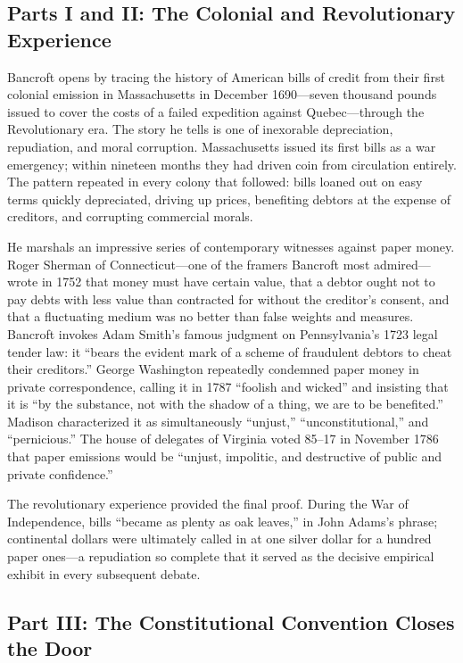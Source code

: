\documentclass[12pt]{article}
\begin{document}
\subsection{Parts I and II: The Colonial and Revolutionary Experience}

Bancroft opens by tracing the history of American bills of credit from
their first colonial emission in Massachusetts in December 1690---seven
thousand pounds issued to cover the costs of a failed expedition against
Quebec---through the Revolutionary era. The story he tells is one of
inexorable depreciation, repudiation, and moral corruption. Massachusetts
issued its first bills as a war emergency; within nineteen months they
had driven coin from circulation entirely. The pattern repeated in every
colony that followed: bills loaned out on easy terms quickly depreciated,
driving up prices, benefiting debtors at the expense of creditors, and
corrupting commercial morals.

He marshals an impressive series of contemporary witnesses against paper
money. Roger Sherman of Connecticut---one of the framers Bancroft most
admired---wrote in 1752 that money must have certain value, that a
debtor ought not to pay debts with less value than contracted for without
the creditor's consent, and that a fluctuating medium was no better than
false weights and measures. Bancroft invokes Adam Smith's famous judgment
on Pennsylvania's 1723 legal tender law: it ``bears the evident mark of
a scheme of fraudulent debtors to cheat their creditors.'' George
Washington repeatedly condemned paper money in private correspondence,
calling it in 1787 ``foolish and wicked'' and insisting that it is ``by
the substance, not with the shadow of a thing, we are to be benefited.''
Madison characterized it as simultaneously ``unjust,'' ``unconstitutional,''
and ``pernicious.'' The house of delegates of Virginia voted 85--17 in
November 1786 that paper emissions would be ``unjust, impolitic, and
destructive of public and private confidence.''

The revolutionary experience provided the final proof. During the War
of Independence, bills ``became as plenty as oak leaves,'' in John
Adams's phrase; continental dollars were ultimately called in at one
silver dollar for a hundred paper ones---a repudiation so complete that
it served as the decisive empirical exhibit in every subsequent debate.

\subsection{Part III: The Constitutional Convention Closes the Door}
\end{document}
